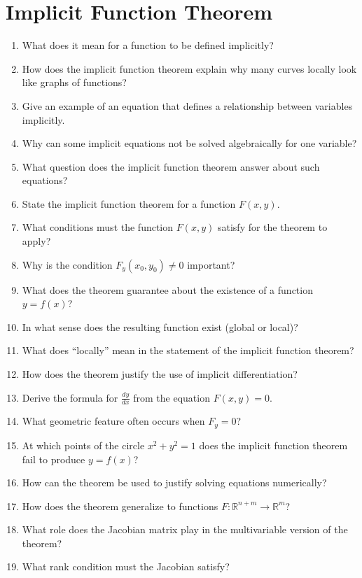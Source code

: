 \section{Implicit Function Theorem}

\begin{enumerate}
  \item What does it mean for a function to be defined implicitly?
  \item How does the implicit function theorem explain why many curves locally look like graphs of functions?
  \item Give an example of an equation that defines a relationship between variables implicitly.
  \item Why can some implicit equations not be solved algebraically for one variable?
  \item What question does the implicit function theorem answer about such equations?
  \item State the implicit function theorem for a function \(F(x,y)\).
  \item What conditions must the function \(F(x,y)\) satisfy for the theorem to apply?
  \item Why is the condition \(F_y(x_0,y_0) \neq 0\) important?
  \item What does the theorem guarantee about the existence of a function \(y=f(x)\)?
  \item In what sense does the resulting function exist (global or local)?
  \item What does ``locally'' mean in the statement of the implicit function theorem?
  \item How does the theorem justify the use of implicit differentiation?
  \item Derive the formula for \(\frac{dy}{dx}\) from the equation \(F(x,y)=0\).
  \item What geometric feature often occurs when \(F_y=0\)?
  \item At which points of the circle \(x^2+y^2=1\) does the implicit function theorem fail to produce \(y=f(x)\)?
  \item How can the theorem be used to justify solving equations numerically?
  \item How does the theorem generalize to functions \(F:\mathbb{R}^{n+m} \to \mathbb{R}^m\)?
  \item What role does the Jacobian matrix play in the multivariable version of the theorem?
  \item What rank condition must the Jacobian satisfy?

\end{enumerate}

